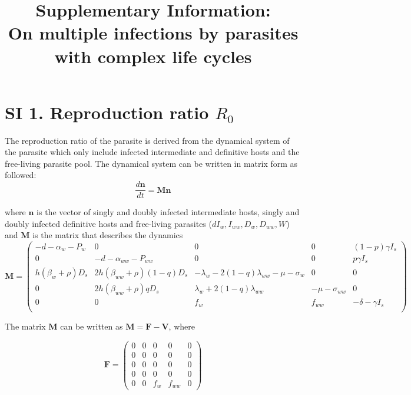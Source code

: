 \documentclass[11pt]{article}
\title{Supplementary Information:\\ On multiple infections by parasites with complex life cycles}
\date{}
\begin{document}
\maketitle

\renewcommand{\theequation}{SI.\arabic{equation}}
\setcounter{equation}{0}

\renewcommand{\thefigure}{SI.\arabic{figure}}
\renewcommand{\thefigure}{SI.\arabic{figure}}
\setcounter{figure}{0}

\renewcommand{\thetable}{SI.\arabic{table}}
\setcounter{table}{0}

\section*{SI 1. Reproduction ratio $R_0$}

The reproduction ratio of the parasite is derived from the dynamical system of the parasite which only include infected intermediate and definitive hosts and the free-living parasite pool. The dynamical system can be written in matrix form as followed:
\[
\frac{d \mathbf{n}}{dt} = \mathbf{M} \mathbf{n}
\]

where $\mathbf{n}$ is the vector of singly and doubly infected intermediate hosts, singly and doubly infected definitive hosts and free-living parasites ($dI_w, I_{ww}, D_w, D_{ww}, W$) and $\mathbf{M}$ is the matrix that describes the dynamics
\[ \mathbf{M} = 
\begin{pmatrix}
- d - \alpha_w - P_w & 0 & 0 & 0 & (1 - p) \gamma I_s \\
0 & -d - \alpha_{ww} - P_{ww} & 0 & 0 & p \gamma I_s \\
h (\beta_w + \rho ) D_s & 2 h (\beta_{ww} + \rho) (1-q) D_s &-\lambda_w - 2  (1-q)\lambda_{ww}  -\mu -\sigma_w & 0 & 0 \\
0 & 2 h (\beta_{ww} + \rho ) q D_s  & \lambda_w + 2 (1-q) \lambda_{ww}  & -\mu - \sigma_{ww} & 0 \\
 0 & 0 & f_w & f_{ww} &- \delta - \gamma I_s  \\
\end{pmatrix}
\]

The matrix $\mathbf{M}$ can be written as $\mathbf{M} = \mathbf{F} - \mathbf{V}$, where

\[
\mathbf{F} = 
\begin{pmatrix}
0 & 0 & 0 & 0 & 0  \\
0 & 0 & 0 & 0 & 0  \\
0 & 0 & 0 & 0 & 0  \\
0 & 0 & 0 & 0 & 0  \\
0 & 0 & f_w & f_{ww} & 0
\end{pmatrix}
\]
\end{document}
